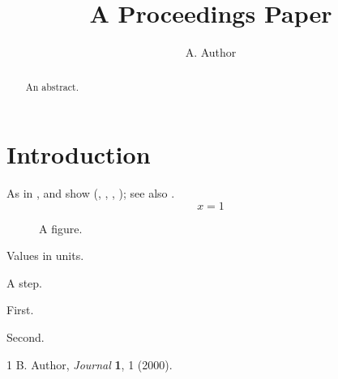 \documentclass{ws-procs9x6}
\begin{document}
\title{A Proceedings Paper}
\author{A. Author}
\address{Somewhere University}
\begin{abstract}An abstract.\end{abstract}
\bodymatter
\section{Introduction}\label{sec:i}
As  in ,  and  show (, , , ); see also
.
\begin{equation}x=1\label{e}\end{equation}
\begin{figure}[h]\centering\figurebox{1pc}{2pc}{}\caption{A figure.}\label{f}\end{figure}
\begin{table}[h]
\begin{tabnote}Values in units.\end{tabnote}\label{t}\end{table}
\begin{algorithm}A step.\end{algorithm}
\begin{unnumlist}\item First.\item Second.\end{unnumlist}
\begin{thebibliography}{1}
 B. Author, \textit{Journal} \textbf{1}, 1 (2000).
\end{thebibliography}
\end{document}
